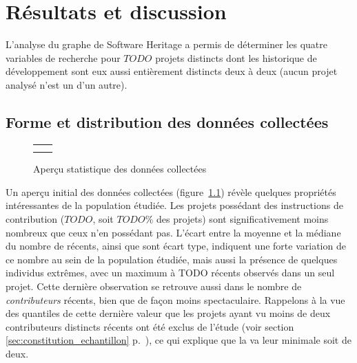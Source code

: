 \chapter{Résultats et discussion}

\captionsetup[figure]{format=plain,singlelinecheck=true,justification=centering}
\captionsetup[subfigure]{format=plain,singlelinecheck=true,justification=centering}

L'analyse du graphe de Software Heritage a permis de déterminer les quatre variables de recherche pour $TODO$
projets distincts dont les historique de développement sont eux aussi entièrement distincts deux à deux (aucun
projet analysé n'est un  d'un autre).

\section{Forme et distribution des données collectées}

\begin{figure}[ht]
    \centering
    \begin{tabular}{cc}
         &
        
        \\
         &
        
    \end{tabular}

    \caption{Aperçu statistique des données collectées}
    \label{fig:data_description}
\end{figure}

Un aperçu initial des données collectées (figure~\ref{fig:data_description}) révèle quelques propriétés
intéressantes de la population étudiée. Les projets possédant des instructions de contribution ($TODO$, soit
$TODO\%$ des projets) sont significativement moins nombreux que ceux n'en possédant pas. L'écart entre la
moyenne et la médiane du nombre de  récents, ainsi que sont écart type, indiquent une forte
variation de ce nombre au sein de la population étudiée, mais aussi la présence de quelques individus
extrêmes, avec un maximum à TODO  récents observés dans un seul projet. Cette dernière
observation se retrouve aussi dans le nombre de \emph{contributeurs} récents, bien que de façon moins
spectaculaire. Rappelons à la vue des quantiles de cette dernière valeur que les projets ayant vu moins de
deux contributeurs distincts récents ont été exclus de l'étude (voir section
\ref{sec:constitution_echantillon} p.~\pageref{sec:constitution_echantillon}), ce qui explique que la va leur
minimale soit de deux.

